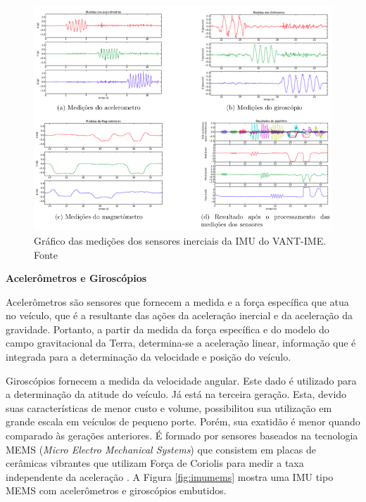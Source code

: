 \documentclass[a4paper, 12pt]{article}
\begin{document}
\begin{figure}[h]
	\centering
		\includegraphics[scale=0.5]{img/imu_VANTIME.png}
	\caption{Gráfico das medições dos sensores inerciais da IMU do VANT-IME. Fonte \cite{Paixao2011}}
	\label{fig:imuVANTIME}
\end{figure}

\noindent\textbf{Acelerômetros e Giroscópios}

Acelerômetros são sensores que fornecem a medida e a força específica que atua no veículo, que é a resultante das ações da aceleração inercial e da aceleração da gravidade. Portanto, a partir da medida da força específica e do modelo do campo gravitacional da Terra, determina-se a aceleração linear, informação que é integrada para a determinação da velocidade e posição do veículo.

Giroscópios fornecem a medida da velocidade angular. Este dado é utilizado para a determinação da atitude do veículo. Já está na terceira geração. Esta, devido suas características de menor custo e volume, possibilitou sua utilização em grande escala em veículos de pequeno porte. Porém, sua exatidão é menor quando comparado às gerações anteriores. É formado por sensores baseados na tecnologia MEMS (\textit{Micro Electro Mechanical Systems}) que consistem em placas de cerâmicas vibrantes que utilizam Força de Coriolis para medir a taxa independente da aceleração \cite{Adalberto2009}. A Figura \ref{fig:imumems} mostra uma IMU tipo MEMS com acelerômetros e giroscópios embutidos. 
\end{document}
